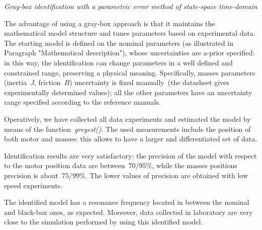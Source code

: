 \textit{Gray-box identification with a parametric error method of state-space time-domain} \\
\par The advantage of using a gray-box approach is that it maintains the mathematical model structure and tunes parameters based on experimental data. The starting model is defined on the nominal parameters (as illustrated in Paragraph "Mathematical description"), whose uncertainties are a-prior specified: in this way, the identification can change parameters in a well defined and constrained range, preserving a physical meaning. Specifically, masses parameters (inertia~$J$, friction~$B$) uncertainty is fixed manually~(the datasheet gives experimentally determined values); all the other parameters have an uncertainty range specified according to the reference manuals.

Operatively, we have collected all data experiments and estimated the model by means of the function~\textit{greyest()}. The used measurements include the position of both motor and masses: this allows to have a larger and differentiated set of data.

Identification results are very satisfactory: the precision of the model with respect to the motor position data are between~$70 / 95\%$, while the masses positions precision is about~$75 / 99\%$. The lower values of precision are obtained with low speed experiments.

The identified model has a resonance frequency located in between the nominal and black-box ones, as expected. Moreover, data collected in laboratory are very close to the simulation performed by using this identified model.
